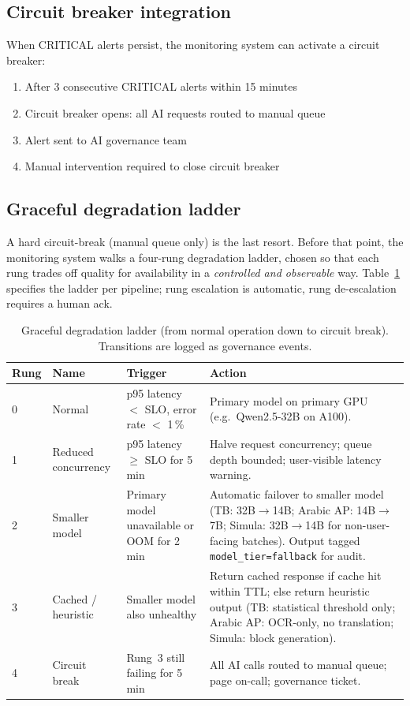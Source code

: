 \documentclass[11pt,a4paper,twoside]{report}
\begin{document}
\subsection{Circuit breaker integration}

When CRITICAL alerts persist, the monitoring system can activate a circuit
breaker:

\begin{enumerate}
\item After 3 consecutive CRITICAL alerts within 15 minutes
\item Circuit breaker opens: all AI requests routed to manual queue
\item Alert sent to AI governance team
\item Manual intervention required to close circuit breaker
\end{enumerate}

\subsection{Graceful degradation ladder}
\label{sec:degradation-ladder}

A hard circuit-break (manual queue only) is the last resort. Before
that point, the monitoring system walks a four-rung degradation
ladder, chosen so that each rung trades off quality for availability
in a \emph{controlled and observable} way.
Table~\ref{tab:degradation-ladder} specifies the ladder per
pipeline; rung escalation is automatic, rung de-escalation requires
a human ack.

\begin{table}[htbp]
\centering
\caption{Graceful degradation ladder (from normal operation down
to circuit break). Transitions are logged as governance events.}
\label{tab:degradation-ladder}
\footnotesize
\begin{tabularx}{\linewidth}{@{}l l l X@{}}
\toprule
\textbf{Rung} & \textbf{Name} & \textbf{Trigger} & \textbf{Action} \\ \midrule
0 & Normal & p95 latency $<$ SLO, error rate $<$ 1\,\% & Primary model on primary GPU (e.g.\ Qwen2.5-32B on A100). \\
1 & Reduced concurrency & p95 latency $\ge$ SLO for 5\,min & Halve request concurrency; queue depth bounded; user-visible latency warning. \\
2 & Smaller model & Primary model unavailable or OOM for 2\,min & Automatic failover to smaller model (TB: 32B$\to$14B; Arabic AP: 14B$\to$7B; Simula: 32B$\to$14B for non-user-facing batches). Output tagged \texttt{model\_tier=fallback} for audit. \\
3 & Cached / heuristic & Smaller model also unhealthy & Return cached response if cache hit within TTL; else return heuristic output (TB: statistical threshold only; Arabic AP: OCR-only, no translation; Simula: block generation). \\
4 & Circuit break & Rung~3 still failing for 5\,min & All AI calls routed to manual queue; page on-call; governance ticket. \\
\bottomrule
\end{tabularx}
\end{table}
\end{document}
